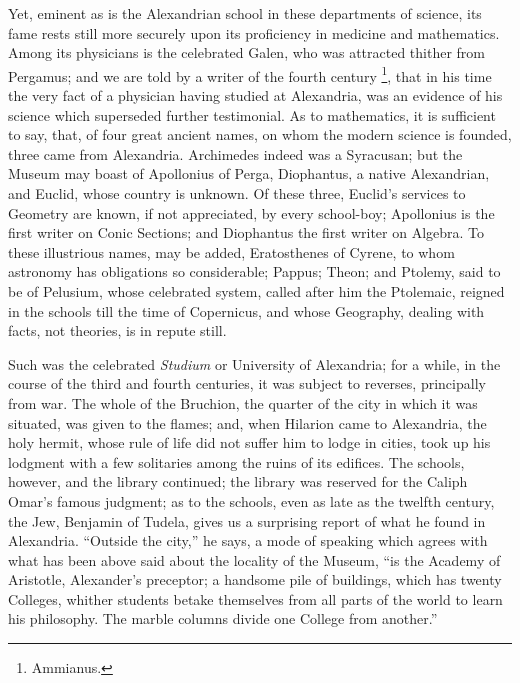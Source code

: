 Yet, eminent as is the Alexandrian school in these departments of
science, its fame rests still more securely upon its proficiency in
medicine and mathematics. Among its physicians is the celebrated
Galen, who was attracted thither from Pergamus; and we are told by a
writer of the fourth century \footnote{Ammianus.},
that in his time the very fact of a physician having studied at
Alexandria, was an evidence of his science which superseded further
testimonial. As to mathematics, it is sufficient to say, that, of four
great ancient names, on whom the modern science is founded, three came
from Alexandria. Archimedes indeed was a Syracusan; but the Museum may
boast of Apollonius of Perga, Diophantus, a native Alexandrian, and
Euclid, whose country is unknown. Of these three, Euclid's services to
Geometry are known, if not appreciated, by every school-boy;
Apollonius is the first writer on Conic Sections; and Diophantus the
first writer on Algebra. To these illustrious names, may be added,
Eratosthenes of Cyrene, to whom astronomy has obligations so
considerable; Pappus; Theon; and Ptolemy, said to be of Pelusium,
whose celebrated system, called after him the Ptolemaic, reigned in
the schools till the time of Copernicus, and whose Geography, dealing
with facts, not theories, is in repute still.

Such was the celebrated \emph{Studium} or University of Alexandria;
for a while, in the course of the third and fourth centuries, it was
subject to reverses, principally from war. The whole of the Bruchion,
the quarter of the city in which it was situated, was given to the
flames; and, when Hilarion came to Alexandria, the holy hermit,
whose rule of life did not suffer him to lodge in cities, took up his
lodgment with a few solitaries among the ruins of its edifices. The
schools, however, and the library continued; the library was reserved
for the Caliph Omar's famous judgment; as to the schools, even as late
as the twelfth century, the Jew, Benjamin of Tudela, gives us a
surprising report of what he found in Alexandria. ``Outside the
city,'' he says, a mode of speaking which agrees with what has
been above said about the locality of the Museum, ``is the Academy
of Aristotle, Alexander's preceptor; a handsome pile of buildings,
which has twenty Colleges, whither students betake themselves from all
parts of the world to learn his philosophy. The marble columns divide
one College from another.''

